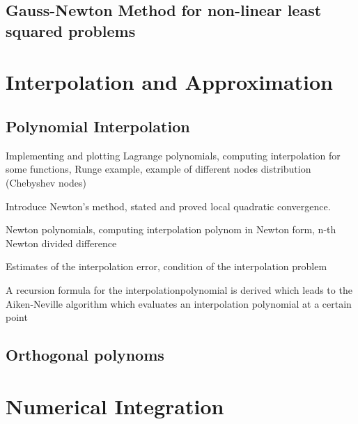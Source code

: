 \documentclass{article}
\theoremstyle{remark}
\begin{document}
\subsection{Gauss-Newton Method for non-linear least squared problems}%
\label{sub:gauss_newton_method_for_non_linear_least_squared_problems}

\newpage
\section{Interpolation and Approximation}%
\label{sec:interpolation_and_approximation}

\subsection{Polynomial Interpolation}%
\label{sub:polynomial_interpolation}

\begin{tcolorbox}
  Implementing and plotting Lagrange polynomials, computing interpolation for some functions, Runge example, example of different nodes distribution (Chebyshev nodes)	
\end{tcolorbox}

\begin{tcolorbox}
   Introduce Newton's method, stated and proved local quadratic convergence. 	
\end{tcolorbox}

\begin{tcolorbox}
  Newton polynomials, computing interpolation polynom in Newton form, n-th Newton divided difference	
\end{tcolorbox}

\begin{tcolorbox}
  Estimates of the interpolation error, condition of the interpolation problem	
\end{tcolorbox}

\begin{tcolorbox}
  A recursion formula for the interpolationpolynomial is derived  which leads to the Aiken-Neville algorithm which evaluates an interpolation polynomial at a certain point	
\end{tcolorbox}


\subsection{Orthogonal polynoms}%
\label{sub:orthogonal_polynoms}

\newpage
\section{Numerical Integration}%
\label{sec:numerical_integration}
\end{document}
